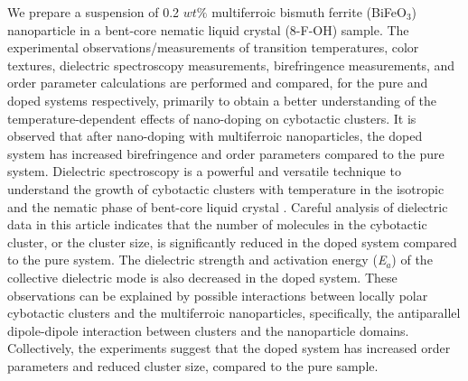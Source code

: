 \documentclass[reprint,amsfonts,amsmath,amssymb,aps,pre,floatfix,10pt]{revtex4-1}
\begin{document}
We prepare a suspension of 0.2 $ wt\%$ multiferroic bismuth ferrite (BiFeO$_3$) nanoparticle in a bent-core nematic liquid crystal (8-F-OH) sample. The experimental observations/measurements of transition temperatures, color textures, dielectric spectroscopy measurements, birefringence measurements, and order parameter calculations are performed and compared, for the pure and doped systems respectively, primarily to obtain a better understanding of the temperature-dependent effects of nano-doping on cybotactic clusters. It is observed that after nano-doping with multiferroic nanoparticles, the doped system has increased birefringence and order parameters compared to the pure system. Dielectric spectroscopy is a powerful and versatile technique to understand the growth of cybotactic clusters with temperature in the isotropic and the nematic phase of bent-core liquid crystal \cite{panarin2018formation_31}. Careful analysis of dielectric data in this article indicates that the number of molecules in the cybotactic cluster, or the cluster size, is significantly reduced in the doped system compared to the pure system. The dielectric strength and activation energy (\textit{E$_a$}) of the collective dielectric mode is also decreased in the doped system. These observations can be explained by possible interactions between locally polar cybotactic clusters and the multiferroic nanoparticles, specifically, the antiparallel dipole-dipole interaction between clusters and the nanoparticle domains. Collectively, the experiments suggest that the doped system has increased order parameters and reduced cluster size, compared to the pure sample.
 
\end{document}

